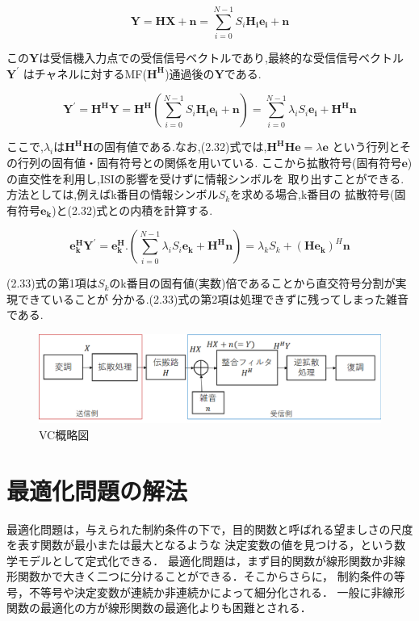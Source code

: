 \begin{equation}
    \bm{Y} = \bm{HX}+\bm{n} = \sum_{i=0}^{N-1} S_i\bm{H_ie_i}+\bm{n}
\end{equation}

この$\bm{Y}$は受信機入力点での受信信号ベクトルであり,最終的な受信信号ベクトル$\bm{Y^{\prime}}$
はチャネルに対するMF($\bm{H^H}$)通過後の$\bm{Y}$である.

\begin{equation}
    \bm{Y^{\prime}}=\bm{H^HY}=\bm{H^H}
    \left(
        \sum_{i=0}^{N-1} S_i\bm{H_ie_i}+\bm{n}
    \right)
    =\sum_{i=0}^{N-1} \lambda_iS_i\bm{e_i}+\bm{H^Hn}
\end{equation}

ここで,$\lambda_i$は$\bm{H^HH}$の固有値である.なお,(2.32)式では,$\bm{H^HHe}=\lambda\bm{e}$
という行列とその行列の固有値・固有符号との関係を用いている.
ここから拡散符号(固有符号$\bm{e}$)の直交性を利用し,ISIの影響を受けずに情報シンボルを
取り出すことができる.方法としては,例えばk番目の情報シンボル$S_k$を求める場合,k番目の
拡散符号(固有符号$\bm{e_k}$)と(2.32)式との内積を計算する.

\begin{equation}
    \bm{e_k^HY^{\prime}}=\bm{e_k^H}.
    \left(
        \sum_{i=0}^{N-1} \lambda_iS_i\bm{e_k}+\bm{H^Hn}
    \right)
    =\lambda_kS_k+(\bm{He_k})^H\bm{n}
\end{equation}

(2.33)式の第1項は$S_k$のk番目の固有値(実数)倍であることから直交符号分割が実現できていることが
分かる.(2.33)式の第2項は処理できずに残ってしまった雑音である.

\begin{figure}
    \centering
    \includegraphics[width=\linewidth]{chapter2/figure/VC.eps}
    \caption{VC概略図}
    \label{figVC}
\end{figure}

\section{最適化問題の解法}
最適化問題は，与えられた制約条件の下で，目的関数と呼ばれる望ましさの尺度を表す関数が最小または最大となるような
決定変数の値を見つける，という数学モデルとして定式化できる． \cite{ibaragi}
最適化問題は，まず目的関数が線形関数か非線形関数かで大きく二つに分けることができる．そこからさらに，
制約条件の等号，不等号や決定変数が連続か非連続かによって細分化される．
一般に非線形関数の最適化の方が線形関数の最適化よりも困難とされる．

